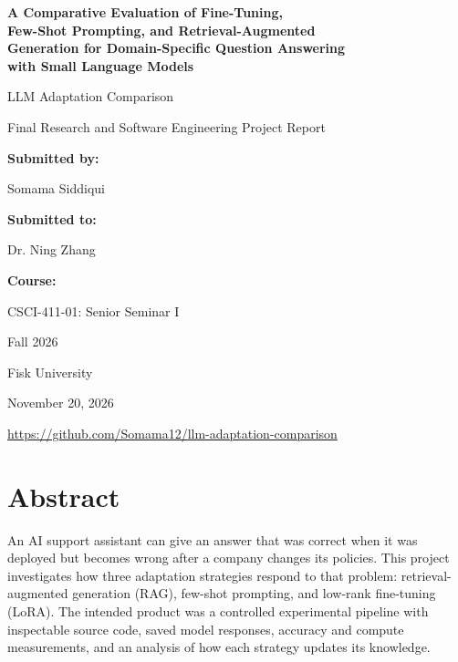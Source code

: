 \documentclass[11pt,letterpaper,oneside]{report}
\newcommand{\repo}{https://github.com/Somama12/llm-adaptation-comparison}
\begin{document}
\hypersetup{pageanchor=false}
\begin{titlepage}
\centering
\vspace*{1.1cm}
{\Large\bfseries A Comparative Evaluation of Fine-Tuning,\\[0.25em]
Few-Shot Prompting, and Retrieval-Augmented\\[0.25em]
Generation for Domain-Specific Question Answering\\[0.25em]
with Small Language Models\par}
\vspace{0.8cm}
{\large LLM Adaptation Comparison\par}
\vspace{0.25cm}
{\large Final Research and Software Engineering Project Report\par}
\vfill
{\bfseries Submitted by:}\par
Somama Siddiqui\par
\vspace{0.6cm}
{\bfseries Submitted to:}\par
Dr. Ning Zhang\par
\vspace{0.6cm}
{\bfseries Course:}\par
CSCI-411-01: Senior Seminar I\par
Fall 2026\par
\vspace{0.7cm}
Fisk University\par
November 20, 2026\par
\vspace{0.7cm}
{\small\url{\repo}\par}
\vspace*{0.6cm}
\end{titlepage}
\hypersetup{pageanchor=true}
\chapter*{Abstract}
An AI support assistant can give an answer that was correct when it was deployed but becomes wrong after a company changes its policies. This project investigates how three adaptation strategies respond to that problem: retrieval-augmented generation (RAG), few-shot prompting, and low-rank fine-tuning (LoRA). The intended product was a controlled experimental pipeline with inspectable source code, saved model responses, accuracy and compute measurements, and an analysis of how each strategy updates its knowledge.
\end{document}
